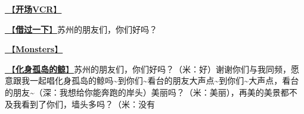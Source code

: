 \documentclass[]{ctexbook}
\begin{document}
\hyperref[opening-vcr]{🎥【\textbf{开场VCR}】}

\hyperref[I-will-go-my-way]{🎵【\textbf{借过一下}】}苏州的朋友们，你们好吗？

\hyperref[Monsters]{🎵【\textbf{Monsters}】}

\hyperref[hua-shen-gu-dao-de-jing]{🎵【\textbf{化身孤岛的鲸}】}苏州的朋友们，你们好吗？（米：好）谢谢你们与我同频，愿意跟我一起唱化身孤岛的鲸吗\textasciitilde 到你们\textasciitilde 看台的朋友大声点\textasciitilde 到你们\textasciitilde 大声点，看台的朋友\textasciitilde（深：我想给你能奔跑的岸头）美丽吗？（米：美丽），再美的美景都不及我看到了你们，墙头多吗？（米：没有
\end{document}
